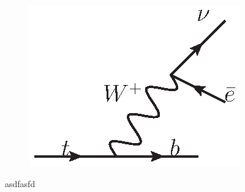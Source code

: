 \begin{figure}[!htbp]
\begin{subfigure}[b]{0.3\textwidth}
        \includegraphics[width=\linewidth]{figures/TopDecayToBPlusElectronNu.eps}
        \caption{}
        \label{fig:TopDecay}
    \end{subfigure}%

    \caption[
        Photon interaction examples
    ]{
    asdfasfd
    }
    \label{fig:WeakExamples}
\end{figure}